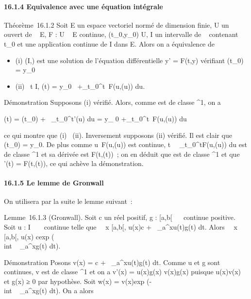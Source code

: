 \documentclass[]{article}
\begin{document}
\paragraph{16.1.4 Equivalence avec une équation intégrale}

Théorème~16.1.2 Soit E un espace vectoriel normé de dimension finie, U
un ouvert de ~ \times E, F : U \rightarrow~ E continue, (t_0,y_0) \in U,
I un intervalle de ~ contenant t_0 et \phi une application
continue de I dans E. Alors on a équivalence de

\begin{itemize}
\itemsep1pt\parskip0pt
\item
  (i) (I,\phi) est une solution de l'équation différentielle y' = F(t,y)
  vérifiant \phi(t_0) = y_0
\item
  (ii) \forall~t \in I, \phi(t) = y_0~
  +\int  _t_0^t~F(u,\phi(u))
  du.
\end{itemize}

Démonstration Supposons (i) vérifié. Alors, comme \phi est de classe
^1, on a

\phi(t) = \phi(t_0) +\int ~
_t_0^t\phi'(u) du = y_ 0
+\int  _t_0^t~F(u,\phi(u))
du

ce qui montre que (i) \rigtharrow~(ii). Inversement supposons (ii) vérifié. Il est
clair que \phi(t_0) = y_0. De plus comme
u\mapsto~F(u,\phi(u)) est continue,
t\mapsto~\int ~
_t_0^tF(u,\phi(u)) du est de classe ^1
et sa dérivée est F(t,\phi(t))~; on en déduit que \phi est de classe
^1 et que \phi'(t) = F(t,\phi(t)), ce qui achève la démonstration.

\paragraph{16.1.5 Le lemme de Gronwall}

On utilisera par la suite le lemme suivant~:

Lemme~16.1.3 (Gronwall). Soit c un réel positif, g : [a,b[\rightarrow~ ~
continue positive. Soit u : I \rightarrow~ ~ continue telle que
\forall~~x \in [a,b[, u(x)\leq c
+\int ~
_a^xu(t)g(t) dt. Alors
\forall~~x \in [a,b[, u(x)\leq
cexp (\\int ~
_a^xg(t) dt).

Démonstration Posons v(x) = c +\int ~
_a^xu(t)g(t) dt. Comme u et g sont
continues, v est de classe ^1 et on a v'(x) =
u(x)g(x) \leq v(x)g(x) puisque
u(x)\leq v(x) et g(x) ≥ 0 par hypothèse. Soit w(x) =
v(x)exp (-\\int ~
_a^xg(t) dt). On a alors
\end{document}
